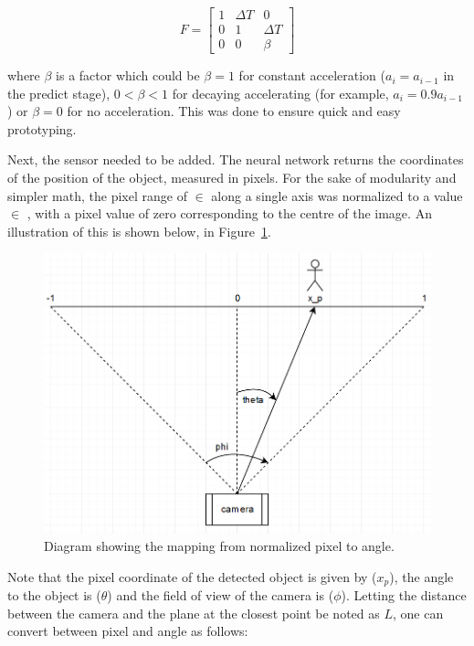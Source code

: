 \[ F = \begin{bmatrix} 1 & \Delta T & 0 \\
                       0 & 1 & \Delta T \\
					   0 & 0 & \beta
		\end{bmatrix} \]

where $\beta$ is a factor which could be $\beta = 1$ for constant acceleration ($a_i = a_{i-1}$ in the predict stage), $0 < \beta < 1$ for decaying accelerating (for example, $a_i = 0.9 a_{i-1}$) or $\beta = 0$ for no acceleration. This was done to ensure quick and easy prototyping.

Next, the sensor needed to be added. The neural network returns the coordinates of the position of the object, measured in pixels. For the sake of modularity and simpler math, the pixel range of  $\in$ \pyth{[0, 299]} along a single axis was normalized to a value  $\in$ \pyth{[-1, 1]}, with a pixel value of zero corresponding to the centre of the image. An illustration of this is shown below, in Figure~\ref{fig:pixel_to_angle}.

\begin{figure}[h!]
  \centering
  \includegraphics[width=\textwidth]{methodology/pixel_to_angle2}
  \caption{\label{fig:pixel_to_angle} Diagram showing the mapping from normalized pixel to angle.}
\end{figure}

Note that the pixel coordinate of the detected object is given by  ($x_p$), the angle to the object is  ($\theta$) and the field of view of the camera is  ($\phi$). Letting the distance between the camera and the plane at the closest point be noted as $L$, one can convert between pixel and angle as follows:


